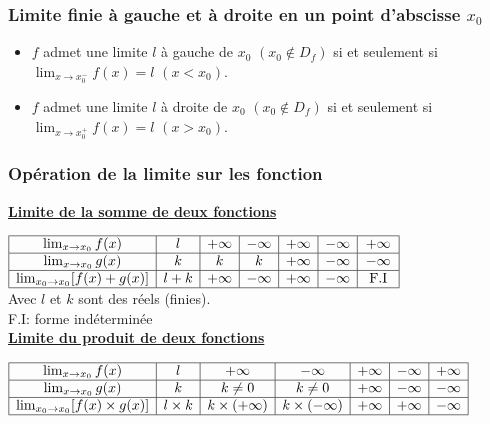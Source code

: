 \documentclass[a4paper, 12pt]{report}
\begin{document}
                \subsubsection{Limite finie à gauche et à droite en un point d'abscisse $x_0$}
                    \begin{itemize}
                        \item $f$ admet une limite $l$ à gauche de $x_0$ $(x_0\not\in D_f)$ si et seulement si $\lim_{x\to x_0^- }f(x)=l$ $(x<x_0)$.
                        \item $f$ admet une limite $l$ à droite de $x_0$ $(x_0\not\in D_f)$ si et seulement si $\lim_{x\to x_0^+ }f(x)=l$ $(x>x_0)$.
                    \end{itemize}
                \subsubsection{Opération de la limite sur les fonction}
                    \underline{\textbf{Limite de la somme de deux fonctions}}

                   $\begin{array}{|c|c|c|c|c|c|c|}
                        \hline
                        \lim_{x\to x_0}f(x)  &  l  & +\infty & -\infty & +\infty & -\infty & +\infty \\ \hline
                        \lim_{x\to x_0}g(x)  &  k  &    k    &   k     & +\infty & -\infty & -\infty \\ \hline
                \lim_{x_0\to x_0}[f(x)+g(x)] & l+k & +\infty & -\infty & +\infty & -\infty & \text{ F.I }  \\ \hline   

                    \end{array}$\\

                    Avec $l$ et $k$ sont des réels (finies).\\
                    F.I: forme indéterminée\\

                    \underline{\textbf{Limite du produit de deux fonctions}}

                   $\begin{array}{|c|c|c|c|c|c|c|}
                    \hline
                    \lim_{x\to x_0}f(x)  &     l     &      +\infty      &      -\infty      & +\infty & -\infty & +\infty \\ \hline
                    \lim_{x\to x_0}g(x)  &     k     &      k\neq 0      &      k\neq 0      & +\infty & -\infty & -\infty \\ \hline
    \lim_{x_0\to x_0}[f(x)\times g(x)]   & l\times k & k\times (+\infty) & k\times (-\infty) & +\infty & +\infty & -\infty \\ \hline              
                \end{array}$ \\ 
\end{document}
